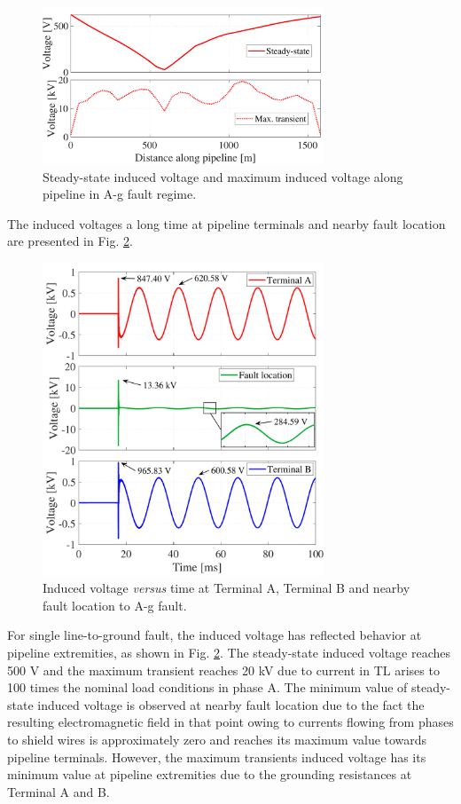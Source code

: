 \documentclass[5p,twocolumn]{elsarticle}
\begin{document}
\begin{figure}[h]
	\begin{center}
		\includegraphics[width=8.4cm]{img/AGindVoltage.pdf}    %
		\caption{Steady-state induced voltage and maximum induced voltage along pipeline in A-g fault regime.} 
		\label{fig:AGindVoltage}
	\end{center}
\end{figure}

The induced voltages a long time at pipeline terminals and nearby fault location are presented in Fig. \ref{fig:AGindVoltage3plots}.

\begin{figure}[H]
	\begin{center}
		\includegraphics[width=8.4cm]{img/AGindVoltage_3plots.pdf}    %
		\caption{Induced voltage \textit{versus} time at Terminal A, Terminal B and nearby fault location to A-g fault.} 
		\label{fig:AGindVoltage3plots}
	\end{center}
\end{figure}



For single line-to-ground fault, the induced voltage has reflected behavior at pipeline extremities, as shown in Fig. \ref{fig:AGindVoltage3plots}. The steady-state induced voltage reaches 500 V and the maximum transient reaches 20 kV due to current in TL arises to 100 times the nominal load conditions in phase A. The minimum value of steady-state induced voltage is observed at nearby fault location due to the fact the resulting electromagnetic field in that point owing to currents flowing from phases to shield wires is approximately zero and reaches its maximum value towards pipeline terminals. However, the maximum transients induced voltage has its minimum value at pipeline extremities due to the grounding resistances at Terminal A and B.
\end{document}
